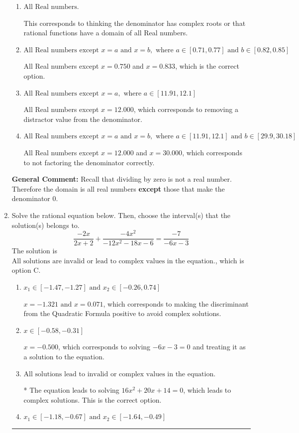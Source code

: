 \documentclass{extbook}[14pt]
\newcommand{\litem}[1]{\item #1

\rule{\textwidth}{0.4pt}}
\begin{document}
\begin{enumerate}
{\begin{enumerate}[label=\Alph*.]
All Real numbers except $x = 0.750$, which corresponds to removing only 1 value from the denominator.
\item \( \text{All Real numbers.} \)

This corresponds to thinking the denominator has complex roots or that rational functions have a domain of all Real numbers.
\item \( \text{All Real numbers except } x = a \text{ and } x = b, \text{ where } a \in [0.71, 0.77] \text{ and } b \in [0.82, 0.85] \)

All Real numbers except $x = 0.750$ and $x = 0.833$, which is the correct option.
\item \( \text{All Real numbers except } x = a, \text{ where } a \in [11.91, 12.1] \)

All Real numbers except $x = 12.000$, which corresponds to removing a distractor value from the denominator.
\item \( \text{All Real numbers except } x = a \text{ and } x = b, \text{ where } a \in [11.91, 12.1] \text{ and } b \in [29.9, 30.18] \)

All Real numbers except $x = 12.000$ and $x = 30.000$, which corresponds to not factoring the denominator correctly.
\end{enumerate}

\textbf{General Comment:} Recall that dividing by zero is not a real number. Therefore the domain is all real numbers \textbf{except} those that make the denominator 0.
}
\litem{
Solve the rational equation below. Then, choose the interval(s) that the solution(s) belongs to.
\[ \frac{-2x}{2x + 2} + \frac{-4x^{2}}{-12x^{2} -18 x -6} = \frac{-7}{-6x -3} \]The solution is \( \text{All solutions are invalid or lead to complex values in the equation.} \), which is option C.\begin{enumerate}[label=\Alph*.]
\item \( x_1 \in [-1.47, -1.27] \text{ and } x_2 \in [-0.26,0.74] \)

$x = -1.321 \text{ and } x = 0.071$, which corresponds to making the discriminant from the Quadratic Formula positive to avoid complex solutions.
\item \( x \in [-0.58,-0.31] \)

$x = -0.500$, which corresponds to solving $-6x -3 = 0$ and treating it as a solution to the equation.
\item \( \text{All solutions lead to invalid or complex values in the equation.} \)

* The equation leads to solving $16x^{2} +20 x + 14=0$, which leads to complex solutions. This is the correct option.
\item \( x_1 \in [-1.18, -0.67] \text{ and } x_2 \in [-1.64,-0.49] \)


\end{enumerate}}
\end{enumerate}
\end{document}

